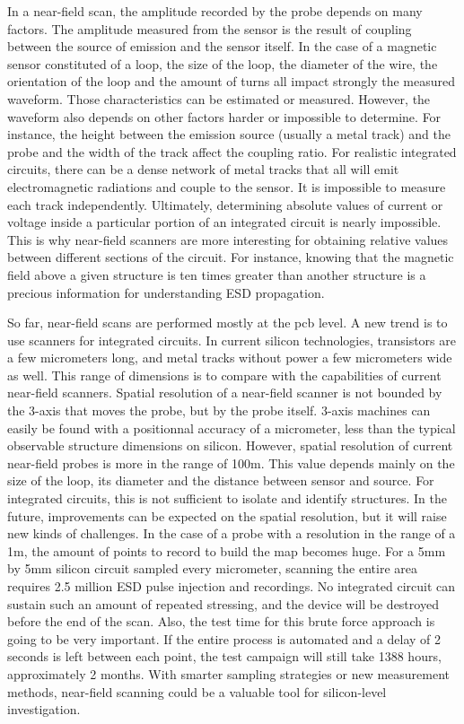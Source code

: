 In a near-field scan, the amplitude recorded by the probe depends on many factors.
The amplitude measured from the sensor is the result of coupling between the source of emission and the sensor itself.
In the case of a magnetic sensor constituted of a loop, the size of the loop, the diameter of the wire, the orientation of the loop and the amount of turns all impact strongly the measured waveform.
Those characteristics can be estimated or measured.
However, the waveform also depends on other factors harder or impossible to determine.
For instance, the height between the emission source (usually a metal track) and the probe and the width of the track affect the coupling ratio.
For realistic integrated circuits, there can be a dense network of metal tracks that all will emit electromagnetic radiations and couple to the sensor.
It is impossible to measure each track independently.
Ultimately, determining absolute values of current or voltage inside a particular portion of an integrated circuit is nearly impossible.
This is why near-field scanners are more interesting for obtaining relative values between different sections of the circuit.
For instance, knowing that the magnetic field above a given structure is ten times greater than another structure is a precious information for understanding ESD propagation.

So far, near-field scans are performed mostly at the \gls{pcb} level.
A new trend is to use scanners for integrated circuits.
In current silicon technologies, transistors are a few micrometers long, and metal tracks without power a few micrometers wide as well.
This range of dimensions is to compare with the capabilities of current near-field scanners.
Spatial resolution of a near-field scanner is not bounded by the 3-axis that moves the probe, but by the probe itself.
3-axis machines can easily be found with a positionnal accuracy of a micrometer, less than the typical observable structure dimensions on silicon.
However, spatial resolution of current near-field probes is more in the range of 100\textmu{}m.
This value depends mainly on the size of the loop, its diameter and the distance between sensor and source.
For integrated circuits, this is not sufficient to isolate and identify structures.
In the future, improvements can be expected on the spatial resolution, but it will raise new kinds of challenges.
In the case of a probe with a resolution in the range of a 1\textmu{}m, the amount of points to record to build the map becomes huge.
For a 5mm by 5mm silicon circuit sampled every micrometer, scanning the entire area requires 2.5 million ESD pulse injection and recordings.
No integrated circuit can sustain such an amount of repeated stressing, and the device will be destroyed before the end of the scan.
Also, the test time for this brute force approach is going to be very important.
If the entire process is automated and a delay of 2 seconds is left between each point, the test campaign will still take 1388 hours, approximately 2 months.
With smarter sampling strategies or new measurement methods, near-field scanning could be a valuable tool for silicon-level investigation.

